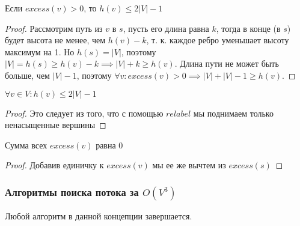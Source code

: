 \begin{corollary}
    Если $excess(v) > 0$, то $h(v) \leq 2|V| - 1$
\end{corollary}

\begin{proof}
    Рассмотрим путь из $v$ в $s$, пусть его длина равна $k$, тогда в конце (в $s$) будет высота не менее, чем $h(v) - k$, т. к. каждое ребро уменьшает высоту максимум на 1. Но $h(s) = |V|$, поэтому $|V| = h(s) \geq h(v) - k \implies |V| + k \geq h(v)$. Длина пути не может быть больше, чем $|V| - 1$, поэтому $\forall v: excess(v) > 0 \implies |V| + |V| - 1 \geq h(v)$.
\end{proof}

\begin{corollary}
    $\forall v \in V: h(v) \leq 2|V| - 1$
\end{corollary}

\begin{proof}
    Это следует из того, что с помощью $relabel$ мы поднимаем только ненасыщенные вершины
\end{proof}

\begin{proposition}
    Сумма всех $excess(v)$ равна 0
\end{proposition}

\begin{proof}
    Добавив единичку к $excess(v)$ мы ее же вычтем из $excess(s)$
\end{proof}

\subsubsection{Алгоритмы поиска потока за $O(V^3)$}

\begin{theorem}
    Любой алгоритм в данной концепции завершается.
\end{theorem}

